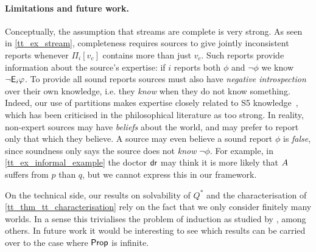 \paragraph{Limitations and future work.}

Conceptually, the assumption that streams are complete is very strong. As seen
in \cref{tt_ex_stream}, completeness requires sources to give jointly inconsistent
reports whenever $\Pi_i[v_c]$ contains more than just $v_c$. Such reports
provide information about the source's expertise: if $i$ reports both $\phi$
and $\neg\phi$ we know $\neg\mathsf{E}_i\varphi$. To provide all sound reports sources
must also have \emph{negative introspection} over their own knowledge, i.e.
they \emph{know} when they do not know something. Indeed, our use of partitions
makes expertise closely related to S5
knowledge~\cite{singleton_booth_22_preprint,singleton2021logic}, which has been
criticised in the philosophical literature as too strong.
%
In reality, non-expert sources may have \emph{beliefs} about the world, and may
prefer to report only that which they believe. A source may even believe a
sound report $\phi$ is \emph{false}, since soundness only says the source does
not \emph{know} $\neg\phi$. For example, in \cref{tt_ex_informal_example} the
doctor $\mathsf{dr}{}$ may think it is more likely that $A{}$ suffers from $p$
than $q$, but we cannot express this in our framework.

On the technical side, our results on solvability of $Q^*$ and the
characterisation of \cref{tt_thm_tt_characterisation} rely on the fact that we
only consider finitely many worlds. In a sense this trivialises the problem of
induction as studied by \textcite{kelly1997reliable,Baltag_2016}, among others. In
future work it would be interesting to see which results can be carried over to
the case where $\mathsf{Prop}$ is infinite.
